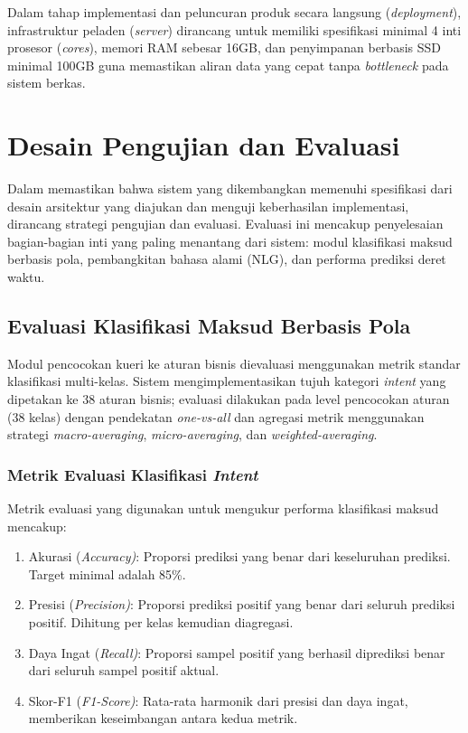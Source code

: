 Dalam tahap implementasi dan peluncuran produk secara langsung (\textit{deployment}), infrastruktur peladen (\textit{server}) dirancang untuk memiliki spesifikasi minimal 4 inti prosesor (\textit{cores}), memori RAM sebesar 16GB, dan penyimpanan berbasis SSD minimal 100GB guna memastikan aliran data yang cepat tanpa \textit{bottleneck} pada sistem berkas. 

\section{Desain Pengujian dan Evaluasi}
\label{sec:evaluasi}

Dalam memastikan bahwa sistem yang dikembangkan memenuhi spesifikasi dari desain arsitektur yang diajukan dan menguji keberhasilan implementasi, dirancang strategi pengujian dan evaluasi. Evaluasi ini mencakup penyelesaian bagian-bagian inti yang paling menantang dari sistem: modul klasifikasi maksud berbasis pola, pembangkitan bahasa alami (NLG), dan performa prediksi deret waktu.

\subsection{Evaluasi Klasifikasi Maksud Berbasis Pola}
\label{subsec:eval-intent}

Modul pencocokan kueri ke aturan bisnis dievaluasi menggunakan metrik standar klasifikasi multi-kelas. Sistem mengimplementasikan tujuh kategori \textit{intent} yang dipetakan ke 38 aturan bisnis; evaluasi dilakukan pada level pencocokan aturan (38 kelas) dengan pendekatan \textit{one-vs-all} dan agregasi metrik menggunakan strategi \textit{macro-averaging}, \textit{micro-averaging}, dan \textit{weighted-averaging}.

\subsubsection{Metrik Evaluasi Klasifikasi \textit{Intent}}

Metrik evaluasi yang digunakan untuk mengukur performa klasifikasi maksud mencakup:

\begin{enumerate}
    \item Akurasi (\textit{Accuracy)}: Proporsi prediksi yang benar dari keseluruhan prediksi. Target minimal adalah 85\%.
    \item Presisi (\textit{Precision)}: Proporsi prediksi positif yang benar dari seluruh prediksi positif. Dihitung per kelas kemudian diagregasi.
    \item Daya Ingat (\textit{Recall)}: Proporsi sampel positif yang berhasil diprediksi benar dari seluruh sampel positif aktual.
    \item Skor-F1 (\textit{F1-Score)}: Rata-rata harmonik dari presisi dan daya ingat, memberikan keseimbangan antara kedua metrik.
\end{enumerate}

